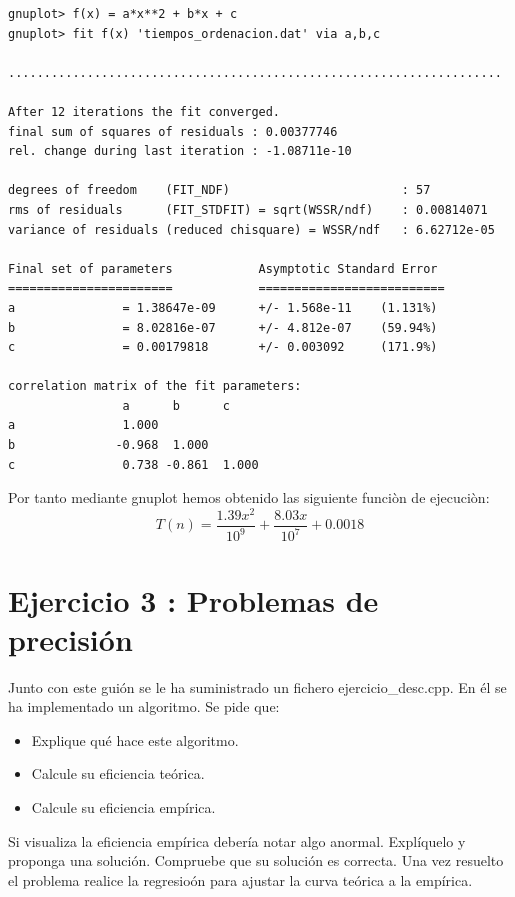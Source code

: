 \documentclass{article}
\begin{document}
\begin{lstlisting}
gnuplot> f(x) = a*x**2 + b*x + c
gnuplot> fit f(x) 'tiempos_ordenacion.dat' via a,b,c

.....................................................................          

After 12 iterations the fit converged.
final sum of squares of residuals : 0.00377746
rel. change during last iteration : -1.08711e-10

degrees of freedom    (FIT_NDF)                        : 57
rms of residuals      (FIT_STDFIT) = sqrt(WSSR/ndf)    : 0.00814071
variance of residuals (reduced chisquare) = WSSR/ndf   : 6.62712e-05

Final set of parameters            Asymptotic Standard Error
=======================            ==========================
a               = 1.38647e-09      +/- 1.568e-11    (1.131%)
b               = 8.02816e-07      +/- 4.812e-07    (59.94%)
c               = 0.00179818       +/- 0.003092     (171.9%)

correlation matrix of the fit parameters:
                a      b      c      
a               1.000 
b              -0.968  1.000 
c               0.738 -0.861  1.000 
\end{lstlisting}
\vspace{10mm}
	Por tanto mediante gnuplot hemos obtenido las siguiente funci\`on de ejecuci\`on:
	\begin{equation}
		T(n) = \frac{1.39x^2}{10^9} + \frac{8.03x}{10^7} + 0.0018
	\end{equation}

\clearpage
\section{Ejercicio 3 : Problemas de precisión}
Junto con este guión se le ha suministrado un fichero ejercicio\_desc.cpp. En él se ha implementado un algoritmo. Se pide que:
\begin{itemize}
	\item Explique qué hace este algoritmo.
	\item Calcule su eficiencia teórica.
	\item Calcule su eficiencia empírica.
\end{itemize}
Si visualiza la eficiencia empírica debería notar algo anormal. Explíquelo y proponga una solución. Compruebe que su solución es correcta. Una vez resuelto el problema realice la regresioón para ajustar la curva teórica a la empírica.\\
\clearpage
\end{document}
